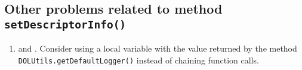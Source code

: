 \subsection{Other problems related to method \texttt{setDescriptorInfo()}}
\begin{enumerate}
	\item {} and . Consider using a local variable with the value returned by the method \texttt{DOLUtils.getDefaultLogger()} instead of chaining function calls.
\end{enumerate}